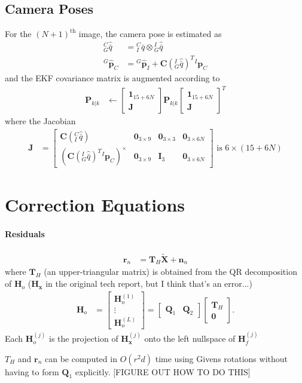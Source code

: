 \documentclass[10pt,letterpaper,fleqn,oneside]{article}
\newcommand{\nl}{\\[0.5em]}
\def\Vec#1{\mathbf{#1}} %
\newcommand{\bbm}{\begin{bmatrix}}
\newcommand{\ebm}{\end{bmatrix}}
\begin{document}
\subsection{Camera Poses}
For the $\left(N+1\right)^{\text{th}}$ image, the camera pose is estimated as
\begin{align}
^C_G\hat{\bar{q}} &= \left.^C_I\bar{q}\right.\otimes\left.^I_G\hat{\bar{q}}\right. \nl
^G\hat{\Vec{p}}_C &= \left.^G\hat{\Vec{p}}_I\right. + \Vec{C}\left(^I_G\hat{\bar{q}}\right)^T \left.^I\Vec{p}_C\right.
\end{align}
and the EKF covariance matrix is augmented according to
\begin{align}
\Vec{P}_{k|k} &\leftarrow \bbm \Vec{1}_{15+6N}  \nl \Vec{J}\ebm \Vec{P}_{k|k} \bbm \Vec{1}_{15+6N}  \nl \Vec{J}\ebm^T
\end{align}
where the Jacobian
\begin{align}
\Vec{J} &= \bbm \Vec{C}\left(^C_I\hat{\bar{q}}\right) & \Vec{0}_{3\times9} & \Vec{0}_{3\times3} & \Vec{0}_{3\times6N} \nl
							\left(\Vec{C}\left(^I_G\hat{\bar{q}}\right)^T \left.^I\Vec{p}_C\right.\right)^\times & \Vec{0}_{3\times9} & \Vec{I}_3 & \Vec{0}_{3\times6N}
				\ebm \text{ is } 6\times\left(15 + 6N\right)
\end{align}

\newpage
\section{Correction Equations}
\paragraph{Residuals}
\begin{align}
	\Vec{r}_n &= \Vec{T}_H \widetilde{\Vec{X}} + \Vec{n}_n
\end{align}
where $\Vec{T}_H$ (an upper-triangular matrix) is obtained from the QR decomposition of $\Vec{H}_o$ ($\Vec{H}_\Vec{x}$ in the original tech report, but I think that's an error...)
\begin{align}
\Vec{H}_o &= \bbm	\Vec{H}^{(1)}_o \nl \vdots \nl \Vec{H}^{(L)}_o \ebm
 = \bbm \Vec{Q}_1 & \Vec{Q}_2 \ebm \bbm \Vec{T}_H \nl \Vec{0} \ebm.
\end{align}
Each $\Vec{H}^{(j)}_o$ is the projection of $\Vec{H}^{(j)}_\Vec{x}$ onto the left nullspace of $\Vec{H}^{(j)}_f$

$T_H$ and $\Vec{r}_n$ can be computed in $O(r^2d)$ time using Givens rotations without having to form $\Vec{Q}_1$ explicitly. [FIGURE OUT HOW TO DO THIS]
\end{document}
